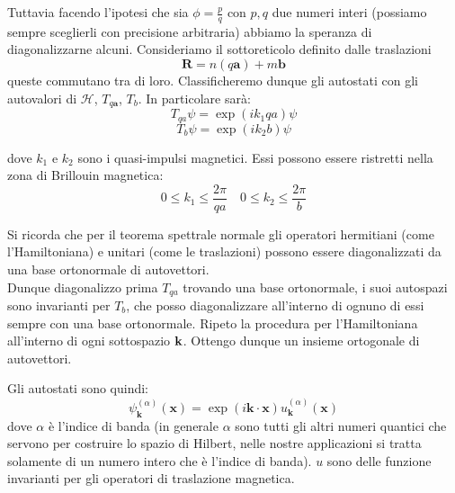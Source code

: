 \documentclass[12pt,a4paper]{article}
\begin{document}
Tuttavia facendo l'ipotesi che sia $\phi = \frac{p}{q}$ con $p, q$ due numeri interi (possiamo sempre sceglierli con precisione arbitraria) abbiamo la speranza di diagonalizzarne alcuni. 
Consideriamo il sottoreticolo definito dalle traslazioni 
\begin{equation}
\mathbf{R} = n(q \mathbf{a}) + m \mathbf{b}
\end{equation}
queste commutano tra di loro. 
Classificheremo dunque gli autostati con gli autovalori di $\mathcal{H}$, $T_{q \mathbf{a}}$, $T_{b}$. In particolare sarà:
$$T_{qa} \psi = \exp \left( i k_1 qa \right) \psi$$
$$T_{b} \psi = \exp \left( i k_2 b \right) \psi$$

dove $k_1$ e $k_2$ sono i quasi-impulsi magnetici. Essi possono essere ristretti nella zona di Brillouin magnetica: $$0 \leq k_1 \leq \frac{2 \pi}{qa} \quad 0 \leq k_2 \leq \frac{2 \pi}{b}$$ 

Si ricorda che per il teorema spettrale normale gli operatori hermitiani (come l'Hamiltoniana) e unitari (come le traslazioni) possono essere diagonalizzati da una base ortonormale di autovettori.\\
Dunque diagonalizzo prima $T_{qa}$ trovando una base ortonormale, i suoi autospazi sono invarianti per $T_{b}$, che posso diagonalizzare all'interno di ognuno di essi sempre con una base ortonormale. Ripeto la procedura per l'Hamiltoniana all'interno di ogni sottospazio $\bold{k}$.  Ottengo dunque un insieme ortogonale di autovettori.

Gli autostati sono quindi: 
\begin{equation}
\psi^{(\alpha)}_{\mathbf{k}} (\mathbf{x}) =  \exp \left( i \mathbf{k} \cdot \mathbf{x} \right) u^{(\alpha)}_{\mathbf{k}} (\mathbf{x})
\end{equation}
dove $\alpha$ è l'indice di banda (in generale $\alpha$ sono tutti gli altri numeri quantici che  servono per costruire lo spazio di Hilbert, nelle nostre applicazioni si tratta solamente di un numero intero che è l'indice di banda). $u$ sono delle funzione invarianti per gli operatori di traslazione magnetica.

\end{document}
